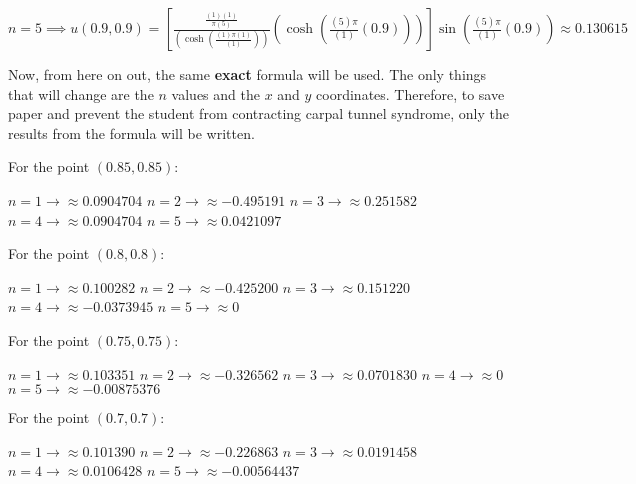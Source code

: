 \documentclass[executivepaper]{article}
\begin{document}
\begin{flushleft}
\vspace{2mm}

$n=5 \implies u(0.9,0.9)=\left[\frac{\frac{(1) (1)}{\pi (5)}}{\left(\cosh\left(\frac{(1) \pi (1)}{(1)}\right)\right)} \left(\cosh\left(\frac{(5) \pi}{(1)} (0.9)\right)\right)\right] \sin\left(\frac{(5) \pi}{(1)} (0.9)\right) \approx 0.130615$

\vspace{2mm}

Now, from here on out, the same \textbf{exact} formula will be used. The only things that will change are the $n$ values and the $x$ and $y$ coordinates. Therefore, to save paper and prevent the student from contracting carpal tunnel syndrome, only the results from the formula will be written.

\vspace{2mm}

For the point $(0.85,0.85)$:

\vspace{1mm}

$n=1 \rightarrow \approx 0.0904704$
$n=2 \rightarrow \approx -0.495191$
$n=3 \rightarrow \approx 0.251582$
$n=4 \rightarrow \approx 0.0904704$
$n=5 \rightarrow \approx 0.0421097$

\vspace{2mm}

For the point $(0.8,0.8)$:

\vspace{1mm}

$n=1 \rightarrow \approx 0.100282$
$n=2 \rightarrow \approx -0.425200$
$n=3 \rightarrow \approx 0.151220$
$n=4 \rightarrow \approx -0.0373945$
$n=5 \rightarrow \approx 0$

\vspace{2mm}

For the point $(0.75,0.75)$:

\vspace{1mm}

$n=1 \rightarrow \approx 0.103351$
$n=2 \rightarrow \approx -0.326562$
$n=3 \rightarrow \approx 0.0701830$
$n=4 \rightarrow \approx 0$
$n=5 \rightarrow \approx -0.00875376$

\vspace{2mm}

For the point $(0.7,0.7)$:

\vspace{1mm}

$n=1 \rightarrow \approx 0.101390$
$n=2 \rightarrow \approx -0.226863$
$n=3 \rightarrow \approx 0.0191458$
$n=4 \rightarrow \approx 0.0106428$
$n=5 \rightarrow \approx -0.00564437$


\end{flushleft}
\end{document}
